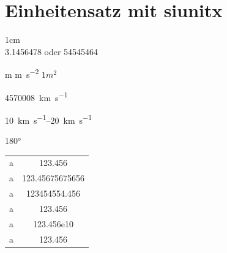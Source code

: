 \documentclass[ngerman,12pt]{scrreprt}
\begin{document}
\chapter{Einheitensatz mit siunitx}

1cm \\

\num{3,1456478} oder \num{54545464}

\si{m} \si{m\per \second^2} $1m^2$

\SI{4570008}{\kilo\meter\per\second}

\SIrange{10}{20}{\kilo\meter\per\second}

\ang{180}


\vspace*{2cm}
\begin{tabular}{rS}
a & 123.456 \\
a & 123.45675675656 \\
a & 123454554.456 \\
a & 123.456 \\
a & 123.456e10 \\
a & 123.456 \\
\end{tabular}
\end{document}
